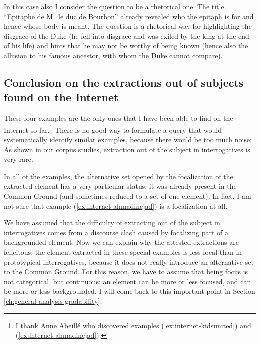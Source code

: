In this case also I consider the question to be a rhetorical one. 
The title ``Epitaphe de M.\ le duc de Bourbon'' already revealed who the epitaph is for and hence whose body is meant. The question is a rhetorical way for highlighting the disgrace of the Duke (he fell into disgrace and was exiled by the king at the end of his life) and hints that he may not be worthy of being known (hence also the allusion to his famous ancestor, with whom the Duke cannot compare). 

\subsection{Conclusion on the extractions out of subjects found on the Internet}

These four examples are the only ones that I have been able to find on the Internet so far.\footnote{I thank Anne Abeillé who discovered examples (\ref{ex:internet-kidsunited}) and (\ref{ex:internet-ahmadinejad}).} There is no good way to formulate a query that would systematically identify similar examples, because there would be too much noise: As shown in our corpus studies, extraction out of the subject in interrogatives is very rare.

In all of the examples, the alternative set opened by the focalization of the extracted element has a very particular status: it was already present in the Common Ground (and sometimes reduced to a set of one element). In fact, I am not sure that example (\ref{ex:internet-ahmadinejad}) is a focalization at all.

We have assumed that the difficulty of extracting out of the subject in interrogatives comes from a discourse clash caused by focalizing part of a backgrounded element. Now we can explain why the attested extractions are felicitous: the element extracted in these special examples is less focal than in prototypical interrogatives, because it does not really introduce an alternative set to the Common Ground. For this reason, we have to assume that being focus is not categorical, but continuous: an element can be more or less focused, and can be more or less backgrounded. I will come back to this important point in Section \ref{ch:general-analysis-gradability}.
